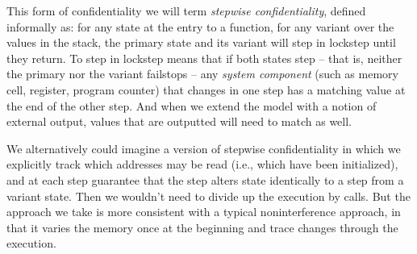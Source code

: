 \documentclass[acmsmall,review,anonymous]{acmart}\settopmatter{printfolios=true,printccs=false,printacmref=false}
\begin{document}
This form of confidentiality we will term {\em stepwise confidentiality}, defined informally
as: for any state at the entry to a function, for any variant over the values in the stack,
the primary state and its variant will step in lockstep until they return. To step in lockstep
means that if both states step -- that is, neither the primary nor the variant failstops --
any {\em system component} (such as memory cell, register, program counter) that changes
in one step has a matching value at the end of the other step. And when we
extend the model with a notion of external output, values that are outputted will need
to match as well.

We alternatively could imagine a version of stepwise confidentiality in which we explicitly
track which addresses may be read (i.e., which have been initialized), and at each step
guarantee that the step alters state identically to a step from a variant state. Then we
wouldn't need to divide up the execution by calls. But the approach we take is more
consistent with a typical noninterference approach, in that it varies the memory once
at the beginning and trace changes through the execution.
\end{document}
